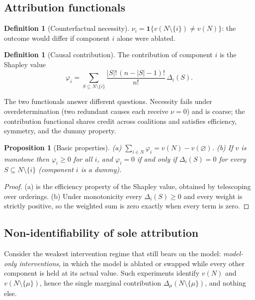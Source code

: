 \documentclass[11pt]{article}
\newtheorem{proposition}[theorem]{Proposition}
\theoremstyle{definition}
\newtheorem{definition}[theorem]{Definition}
\begin{document}
\subsection{Attribution functionals}

\begin{definition}[Counterfactual necessity]
$\nu_i=\mathbf{1}\{v(N\setminus\{i\})\neq v(N)\}$: the outcome would differ if component $i$ alone were ablated.
\end{definition}

\begin{definition}[Causal contribution]
The contribution of component $i$ is the Shapley value \cite{shapley1953}
\[
\varphi_i=\sum_{S\subseteq N\setminus\{i\}}\frac{|S|!\,(n-|S|-1)!}{n!}\,\Delta_i(S).
\]
\end{definition}

The two functionals answer different questions. Necessity fails under overdetermination (two redundant causes each receive $\nu=0$) and is coarse; the contribution functional shares credit across coalitions and satisfies efficiency, symmetry, and the dummy property.

\begin{proposition}[Basic properties]\label{prop:B1}
(a) $\sum_{i\in N}\varphi_i=v(N)-v(\varnothing)$. (b) If $v$ is monotone then $\varphi_i\ge0$ for all $i$, and $\varphi_i=0$ if and only if $\Delta_i(S)=0$ for every $S\subseteq N\setminus\{i\}$ (component $i$ is a \emph{dummy}).
\end{proposition}
\begin{proof}
(a) is the efficiency property of the Shapley value, obtained by telescoping over orderings. (b) Under monotonicity every $\Delta_i(S)\ge0$ and every weight is strictly positive, so the weighted sum is zero exactly when every term is zero.
\end{proof}

\subsection{Non-identifiability of sole attribution}

Consider the weakest intervention regime that still bears on the model: \emph{model-only interventions}, in which the model is ablated or swapped while every other component is held at its actual value. Such experiments identify $v(N)$ and $v(N\setminus\{\mu\})$, hence the single marginal contribution $\Delta_\mu(N\setminus\{\mu\})$, and nothing else.
\end{document}
